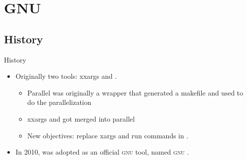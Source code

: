 \section{GNU \LogoParallel}
\subsection{History}
\begin{frame}{History}
   \begin{itemize}[<+(1)->]
      \itemsep10pt
      \item Originally two tools: xxargs and \LogoParallel. \begin{itemize}
         \itemsep5pt
         \item Parallel was originally a wrapper that generated a makefile and used  to do the parallelization
         \item xxargs and \LogoParallel got merged into parallel
         \item New objectives: replace xargs and run commands in \LogoParallel. 
      \end{itemize}
      \item In 2010, \LogoParallel was adopted as an official \textsc{gnu} tool, named \textsc{gnu} \LogoParallel.
   \end{itemize}
\end{frame}

